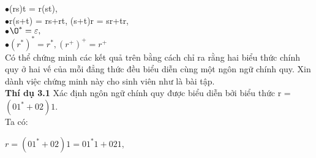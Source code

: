 \begin{flushleft}
\hspace{10mm}$\bullet$(rs)t = r(st),\\
\hspace{10mm}$\bullet$r(s+t) = rs+rt, (s+t)r = sr+tr,\\
\hspace{10mm}$\bullet$$\O^* = \varepsilon,$\\
\hspace{10mm}$\bullet$$(r^*)^* = r^*, (r^+)^+ = r^+$\\
Có thể chứng minh các kết quả trên bằng cách chỉ ra rằng hai biểu thức chính quy ở hai vế của mỗi đẳng thức đều biểu diễn cùng một ngôn ngữ chính quy. Xin dành việc chứng minh này cho sinh viên như là bài tập.\\
\textbf{Thí dụ 3.1} Xác định ngôn ngữ chính quy được biểu diễn bởi biểu thức r = $(01^*+02)1.$\\
Ta có:\\
\end{flushleft}
$r = (01^*+02)1 = 01^*1+021,$
